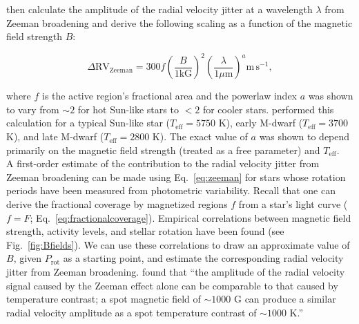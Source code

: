 \cite{reiners13} 
then calculate the amplitude of the radial velocity jitter at a wavelength 
$\lambda$ from Zeeman broadening and 
derive the following scaling as a function of the magnetic field strength $B$:

\begin{equation}
\Delta \mathrm{RV}_{\mathrm{Zeeman}} = 300f \left(\frac{B}{1 \mathrm{kG}} \right)^2 
\left(\frac{\lambda}{1 \mu\mathrm{m}} \right)^a \mathrm{m} \hspace{2pt} \mathrm{s}^{-1}, 
\label{eq:zeeman}
\end{equation}

\noindent where $f$ is the active region's fractional area and the powerlaw index $a$ 
was shown to vary from $\sim 2$ for hot Sun-like stars to $<2$ for cooler stars. 
\cite{reiners13} performed this calculation for a typical Sun-like star ($T_{\mathrm{eff}}=5750$ K), 
early M-dwarf ($T_{\mathrm{eff}}=3700$ K), and late M-dwarf ($T_{\mathrm{eff}}=2800$ K). The 
exact value of $a$ was shown to depend primarily on the magnetic field strength (treated as a 
free parameter) and $T_{\mathrm{eff}}$. \\

A first-order estimate of the 
contribution to the radial velocity jitter from Zeeman broadening can be made using 
Eq.~\ref{eq:zeeman} for stars whose rotation periods have been measured from 
photometric variability. Recall that one can derive the fractional coverage by magnetized 
regions $f$ from a star's light curve ($f=F$; Eq.~\ref{eq:fractionalcoverage}). Empirical 
correlations between magnetic field strength, activity levels, and stellar rotation have 
been found (see Fig.~\ref{fig:Bfields}). We can use these correlations to draw an approximate 
value of $B$, given $P_{\mathrm{rot}}$ as a starting point, and estimate the corresponding 
radial velocity jitter from Zeeman broadening. \cite{reiners13} found that 
``the amplitude of the radial velocity signal caused by the Zeeman effect alone can be comparable to that 
caused by temperature contrast; a spot magnetic field of $\sim 1000$ G can produce a similar 
radial velocity amplitude as a spot temperature contrast of $\sim 1000$ K.'' \\

